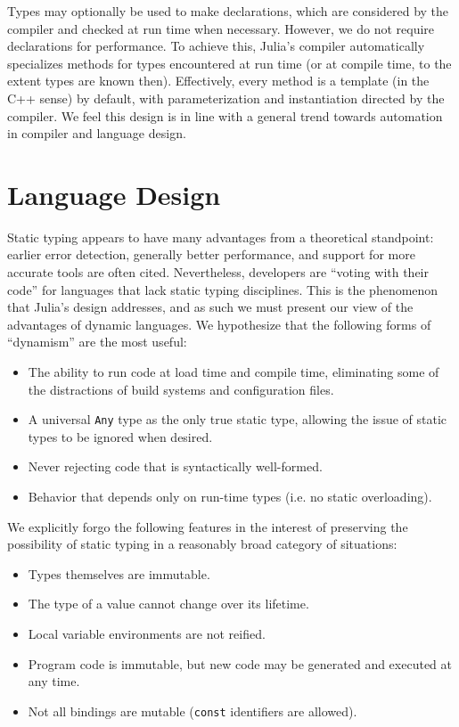 \documentclass[9pt]{sigplanconf}
\begin{document}
Types may optionally be used to make declarations, which are considered by
the compiler and checked at run time when necessary. However, we do not
require declarations for performance. To achieve this, Julia's compiler
automatically specializes methods for types encountered at run time
(or at compile time, to the extent types are known then). Effectively,
every method is a template (in the C++ sense) by default, with
parameterization and instantiation directed by the compiler. We feel this
design is in line with a general trend towards automation in compiler
and language design.


\section{Language Design}


Static typing appears to have many advantages from a theoretical
standpoint: earlier error detection, generally better performance, and
support for more accurate tools are often cited.
Nevertheless, developers are ``voting with their code'' for languages that
lack static typing disciplines. This is the phenomenon that Julia's
design addresses, and as such we must present our view of the advantages of
dynamic languages.
We hypothesize that the following forms of ``dynamism'' are
the most useful:

\begin{itemize}
\item The ability to run code at load time and compile time, eliminating
some of the distractions of build systems and configuration files.
\item A universal {\tt Any} type as the only true static type,
allowing the issue of static types to be ignored when desired.
\item Never rejecting code that is syntactically well-formed.
\item Behavior that depends only on run-time types (i.e. no static overloading).
\end{itemize}

We explicitly forgo the following features in the interest of preserving
the possibility of static typing in a reasonably broad category of
situations:

\begin{itemize}
\item Types themselves are immutable.
\item The type of a value cannot change over its lifetime.
\item Local variable environments are not reified.
\item Program code is immutable, but new code may be generated and executed at any time.
\item Not all bindings are mutable ({\tt const} identifiers are allowed).
\end{itemize}
\end{document}
